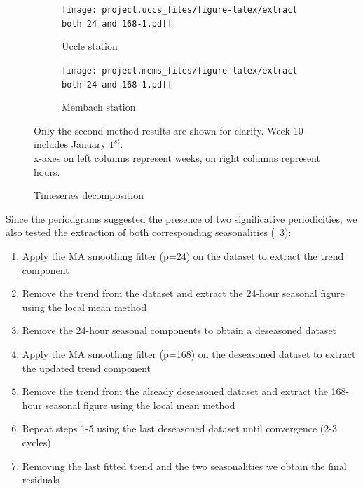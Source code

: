\documentclass[12pt]{article}
\begin{document}
\begin{figure}[h]
	\begin{subfigure}{.5\linewidth}
		\texttt{[image: project.uccs\_files/figure-latex/extract both 24 and 168-1.pdf]}
		\caption{Uccle station}
		\label{fig:decomposed:uccs}
	\end{subfigure}
	\begin{subfigure}{.5\linewidth}
		\texttt{[image: project.mems\_files/figure-latex/extract both 24 and 168-1.pdf]}
		\caption{Membach station}
		\label{fig:decomposed:mems}
	\end{subfigure}
	\caption{Timeseries decomposition}{\centering\small Only the second method results are shown for clarity. Week 10 includes January $1^{st}$.\\\centering x-axes on left columns represent weeks, on right columns represent hours.\\}
	\label{fig:decomposed}
\end{figure}
%
Since the periodgrams suggested the presence of two significative periodicities, we also tested the extraction of both corresponding seasonalities (\figurename~\ref{fig:decomposed}):
\begin{enumerate}[topsep=0.5em,itemsep=0em,partopsep=0.5em]
	\item Apply the MA smoothing filter (p=24) on the dataset to extract the trend component
	\item Remove the trend from the dataset and extract the 24-hour seasonal figure using the local mean method
	\item Remove the 24-hour seasonal components to obtain a deseasoned dataset
	\item Apply the MA smoothing filter (p=168) on the deseasoned dataset to extract the updated trend component
	\item Remove the trend from the already deseasoned dataset and extract the 168-hour seasonal figure using the local mean method
	\item Repeat steps 1-5 using the last deseasoned dataset until convergence (2-3 cycles)
	\item Removing the last fitted trend and the two seasonalities we obtain the final residuals
\end{enumerate}
\end{document}
